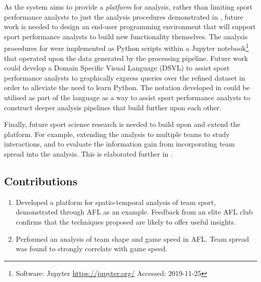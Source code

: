 As the system aims to provide a \textit{platform} for analysis, rather than limiting sport performance analysts to just the analysis procedures demonstrated in , future work is needed to design an end-user programming environment that will support sport performance analysts to build new functionality themselves. The analysis procedures for  were implemented as Python scripts within a Jupyter notebook\footnote{Software: Jupyter \url{https://jupyter.org/} Accessed: 2019-11-25} that operated upon the data generated by the processing pipeline. Future work could develop a Domain Specific Visual Language (DSVL) to assist sport performance analysts to graphically express queries over the refined dataset in order to alleviate the need to learn Python. The notation developed in  could be utilised as part of the language as a way to assist sport performance analysts to construct deeper analysis pipelines that build further upon each other.

Finally, future sport science research is needed to build upon and extend the platform. For example, extending the analysis to multiple teams to study interactions, and to evaluate the information gain from incorporating team spread into the analysis. This is elaborated further in .

\subsection*{Contributions}

\begin{enumerate}
  \item Developed a platform for spatio-temporal analysis of team sport, demonstrated through AFL as an example. Feedback from an elite AFL club confirms that the techniques proposed are likely to offer useful insights.
  \item Performed an analysis of team shape and game speed in AFL. Team spread was found to strongly correlate with game speed.
\end{enumerate}

